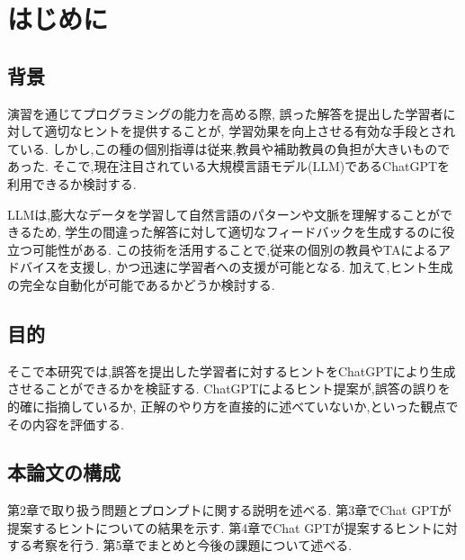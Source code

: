 \chapter{はじめに}

\section{背景}
演習を通じてプログラミングの能力を高める際,
誤った解答を提出した学習者に対して適切なヒントを提供することが,
学習効果を向上させる有効な手段とされている.
しかし,この種の個別指導は従来,教員や補助教員の負担が大きいものであった.
そこで,現在注目されている大規模言語モデル(LLM)であるChatGPTを利用できるか検討する.

LLMは,膨大なデータを学習して自然言語のパターンや文脈を理解することができるため,
学生の間違った解答に対して適切なフィードバックを生成するのに役立つ可能性がある.
この技術を活用することで,従来の個別の教員やTAによるアドバイスを支援し,
かつ迅速に学習者への支援が可能となる.
加えて,ヒント生成の完全な自動化が可能であるかどうか検討する.


\section{目的}
そこで本研究では,誤答を提出した学習者に対するヒントをChatGPTにより生成させることができるかを検証する.
ChatGPTによるヒント提案が,誤答の誤りを的確に指摘しているか,
正解のやり方を直接的に述べていないか,といった観点でその内容を評価する.

\section{本論文の構成}
第2章で取り扱う問題とプロンプトに関する説明を述べる.
%
第3章でChat GPTが提案するヒントについての結果を示す.
%
第4章でChat GPTが提案するヒントに対する考察を行う.
%
第5章でまとめと今後の課題について述べる.


